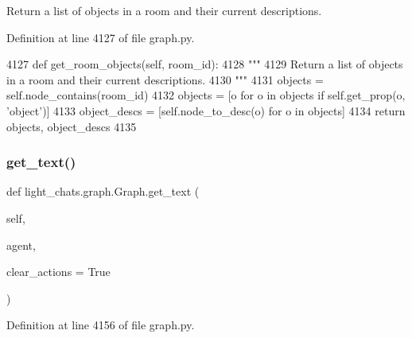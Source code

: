 \begin{DoxyVerb}Return a list of objects in a room and their current descriptions.
\end{DoxyVerb}
 

Definition at line 4127 of file graph.\+py.


\begin{DoxyCode}
4127     \textcolor{keyword}{def }get\_room\_objects(self, room\_id):
4128         \textcolor{stringliteral}{"""}
4129 \textcolor{stringliteral}{        Return a list of objects in a room and their current descriptions.}
4130 \textcolor{stringliteral}{        """}
4131         objects = self.node\_contains(room\_id)
4132         objects = [o \textcolor{keywordflow}{for} o \textcolor{keywordflow}{in} objects \textcolor{keywordflow}{if} self.get\_prop(o, \textcolor{stringliteral}{'object'})]
4133         object\_descs = [self.node\_to\_desc(o) \textcolor{keywordflow}{for} o \textcolor{keywordflow}{in} objects]
4134         \textcolor{keywordflow}{return} objects, object\_descs
4135 
\end{DoxyCode}
\mbox{\label{classlight__chats_1_1graph_1_1Graph_a63268fea99420b5cb83436499cd0676b}} 
\subsubsection{\texorpdfstring{get\+\_\+text()}{get\_text()}}
{\footnotesize\ttfamily def light\+\_\+chats.\+graph.\+Graph.\+get\+\_\+text (\begin{DoxyParamCaption}\item[{}]{self,  }\item[{}]{agent,  }\item[{}]{clear\+\_\+actions = {\ttfamily True} }\end{DoxyParamCaption})}



Definition at line 4156 of file graph.\+py.


